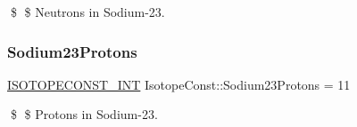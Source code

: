 \$ \$ Neutrons in Sodium-\/23. \mbox{\label{group___isotope_const-_sodium-_na23_gadfc86768bb252e08157304cd87f0be33}} 
\subsubsection{\texorpdfstring{Sodium23\+Protons}{Sodium23Protons}}
{\footnotesize\ttfamily \mbox{\hyperlink{group___isotope_const-_macros_ga5f18360b3e99483a35c32d789e62621c}{I\+S\+O\+T\+O\+P\+E\+C\+O\+N\+S\+T\+\_\+\+I\+NT}} Isotope\+Const\+::\+Sodium23\+Protons = 11}

\$ \$ Protons in Sodium-\/23. 